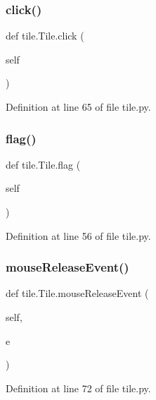 \subsubsection{\texorpdfstring{click()}{click()}}
{\footnotesize\ttfamily def tile.\+Tile.\+click (\begin{DoxyParamCaption}\item[{}]{self }\end{DoxyParamCaption})}



Definition at line 65 of file tile.\+py.

\mbox{\label{classtile_1_1_tile_a54edcdbf94da0c1d8dab7686fdce8a69}} 
\subsubsection{\texorpdfstring{flag()}{flag()}}
{\footnotesize\ttfamily def tile.\+Tile.\+flag (\begin{DoxyParamCaption}\item[{}]{self }\end{DoxyParamCaption})}



Definition at line 56 of file tile.\+py.

\mbox{\label{classtile_1_1_tile_a0441823c54ba6bbd8c29d9d61ff8161b}} 
\subsubsection{\texorpdfstring{mouseReleaseEvent()}{mouseReleaseEvent()}}
{\footnotesize\ttfamily def tile.\+Tile.\+mouse\+Release\+Event (\begin{DoxyParamCaption}\item[{}]{self,  }\item[{}]{e }\end{DoxyParamCaption})}



Definition at line 72 of file tile.\+py.

\mbox{\label{classtile_1_1_tile_af14e5b7f51340e91c603bc032c43d8d5}} 
